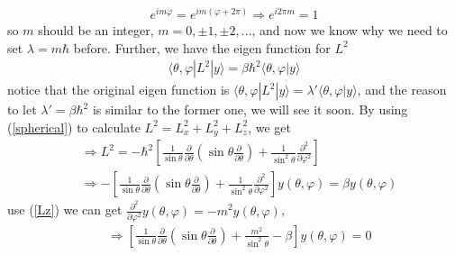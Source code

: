 \documentclass[UTF8,12pt]{article} %
\numberwithin{equation}{section}
\begin{document}
\begin{align}
e^{im\varphi} = e^{im(\varphi + 2\pi)} \Rightarrow e^{i2\pi m} = 1
\end{align}
so $m$ should be an integer, $m = 0, \pm1, \pm2, ...$, and now we know why we need to set $\lambda = m\hbar$ before. Further, we have the eigen function for $L^{2}$
\begin{align}
\langle\theta, \varphi|L^{2}|y\rangle = \beta\hbar^{2}\langle\theta,\varphi|y\rangle
\end{align}
notice that the original eigen function is $\langle\theta, \varphi|L^{2}|y\rangle = \lambda'\langle\theta,\varphi|y\rangle$, and the reason to let $\lambda' = \beta\hbar^{2}$ is similar to the former one, we will see it soon. By using (\ref{spherical}) to calculate $L^{2} = L_{x}^{2} + L_{y}^{2} + L_{z}^{2}$, we get
\begin{align}
&\Rightarrow L^{2} = -\hbar^{2}\left[\frac{1}{\sin\theta}\frac{\partial}{\partial\theta}\left(\sin\theta\frac{\partial}{\partial\theta}\right) + \frac{1}{\sin^{2}\theta}\frac{\partial^{2}}{\partial\varphi^{2}}\right] \\
&\Rightarrow -\left[\frac{1}{\sin\theta}\frac{\partial}{\partial\theta}\left(\sin\theta\frac{\partial}{\partial\theta}\right) + \frac{1}{\sin^{2}\theta}\frac{\partial^{2}}{\partial\varphi^{2}}\right] y(\theta,\varphi) = \beta y(\theta,\varphi)
\end{align}
use (\ref{Lz}) we can get $\frac{\partial^{2}}{\partial\varphi^{2}} y(\theta,\varphi) = -m^{2} y(\theta,\varphi)$,
\begin{align}
&\Rightarrow \left[\frac{1}{\sin\theta}\frac{\partial}{\partial\theta}\left(\sin\theta\frac{\partial}{\partial\theta}\right) + \frac{m^{2}}{\sin^{2}\theta} - \beta\right] y(\theta,\varphi) = 0
\end{align}
\end{document}
